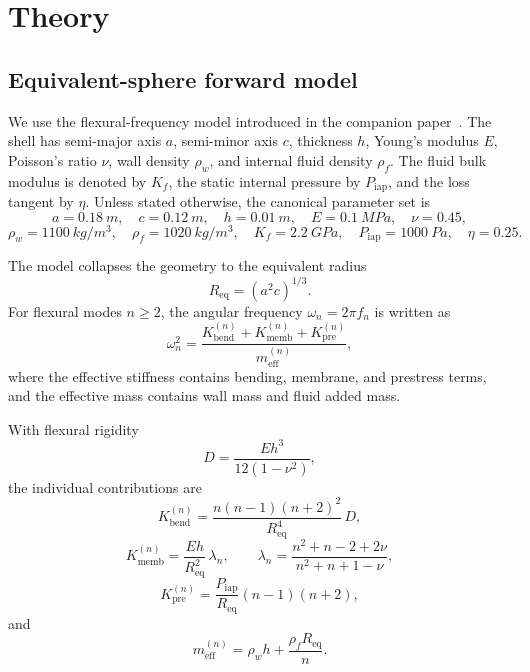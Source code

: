 \section{Theory}\label{sec:theory}

\subsection{Equivalent-sphere forward model}

We use the flexural-frequency model introduced in the companion
paper~\cite{BrowntoneCompanion}.  The shell has semi-major axis $a$, semi-minor
axis $c$, thickness $h$, Young's modulus $E$, Poisson's ratio $\nu$, wall
density $\rho_w$, and internal fluid density $\rho_f$.  The fluid bulk modulus
is denoted by $K_f$, the static internal pressure by $P_\mathrm{iap}$, and the
loss tangent by $\eta$.  Unless stated otherwise, the canonical parameter set is
\[
a=\SI{0.18}{m},\quad
c=\SI{0.12}{m},\quad
h=\SI{0.01}{m},\quad
E=\SI{0.1}{MPa},\quad
\nu=0.45,
\]
\[
\rho_w=\SI{1100}{kg/m^3},\quad
\rho_f=\SI{1020}{kg/m^3},\quad
K_f=\SI{2.2}{GPa},\quad
P_\mathrm{iap}=\SI{1000}{Pa},\quad
\eta=0.25.
\]

The model collapses the geometry to the equivalent radius
\begin{equation}\label{eq:req}
  R_\mathrm{eq} = (a^2 c)^{1/3}.
\end{equation}
For flexural modes $n \geq 2$, the angular frequency $\omega_n=2\pi f_n$ is
written as
\begin{equation}\label{eq:flexural_forward}
  \omega_n^2
  =
  \frac{K_\mathrm{bend}^{(n)} + K_\mathrm{memb}^{(n)} + K_\mathrm{pre}^{(n)}}
       {m_\mathrm{eff}^{(n)}},
\end{equation}
where the effective stiffness contains bending, membrane, and prestress terms,
and the effective mass contains wall mass and fluid added mass.

With flexural rigidity
\begin{equation}
  D = \frac{E h^3}{12(1-\nu^2)},
\end{equation}
the individual contributions are
\begin{equation}
  K_\mathrm{bend}^{(n)}
  =
  \frac{n(n-1)(n+2)^2}{R_\mathrm{eq}^4}\,D,
\end{equation}
\begin{equation}
  K_\mathrm{memb}^{(n)}
  =
  \frac{E h}{R_\mathrm{eq}^2}\,\lambda_n,
  \qquad
  \lambda_n
  =
  \frac{n^2+n-2+2\nu}{n^2+n+1-\nu},
\end{equation}
\begin{equation}
  K_\mathrm{pre}^{(n)}
  =
  \frac{P_\mathrm{iap}}{R_\mathrm{eq}}(n-1)(n+2),
\end{equation}
and
\begin{equation}
  m_\mathrm{eff}^{(n)}
  =
  \rho_w h + \frac{\rho_f R_\mathrm{eq}}{n}.
\end{equation}


